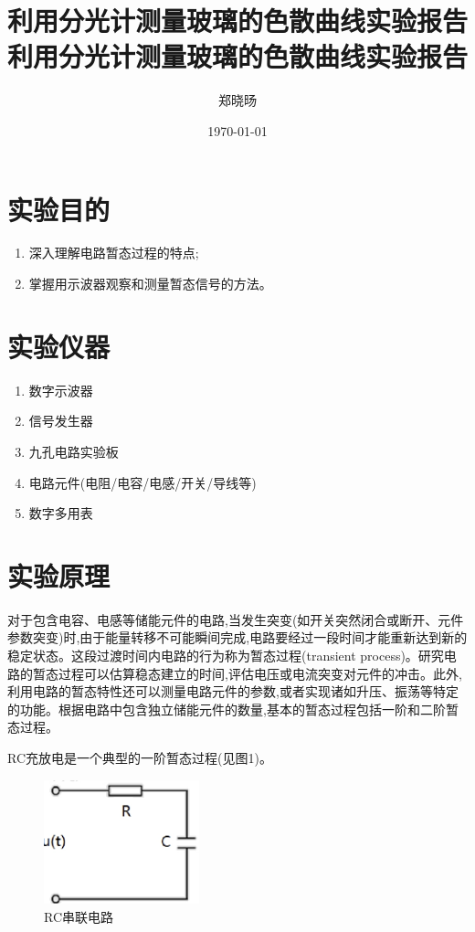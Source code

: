\documentclass[UTF8]{ctexart}
\title{利用分光计测量玻璃的色散曲线实验报告}
\title{利用分光计测量玻璃的色散曲线实验报告}
\author{郑晓旸}
\date{\today}
\begin{document}
\fancyfoot[C]{\thepage}

\maketitle
\tableofcontents
\newpage

\section{实验目的}
\begin{enumerate}
    \item 深入理解电路暂态过程的特点;
    \item 掌握用示波器观察和测量暂态信号的方法。
\end{enumerate} 
\section{实验仪器}
\begin{enumerate}
    \item 数字示波器
    \item 信号发生器
    \item 九孔电路实验板
    \item 电路元件(电阻/电容/电感/开关/导线等)
    \item 数字多用表
\end{enumerate}

\section{实验原理}

对于包含电容、电感等储能元件的电路,当发生突变(如开关突然闭合或断开、元件参数突变)时,由于能量转移不可能瞬间完成,电路要经过一段时间才能重新达到新的稳定状态。这段过渡时间内电路的行为称为暂态过程(transient process)。研究电路的暂态过程可以估算稳态建立的时间,评估电压或电流突变对元件的冲击。此外,利用电路的暂态特性还可以测量电路元件的参数,或者实现诸如升压、振荡等特定的功能。根据电路中包含独立储能元件的数量,基本的暂态过程包括一阶和二阶暂态过程。

RC充放电是一个典型的一阶暂态过程(见图1)。
\begin{figure}[ht]
\centering
\includegraphics[width=0.4\textwidth]{RC.png}
\caption{RC串联电路}
\end{figure}
\end{document}
